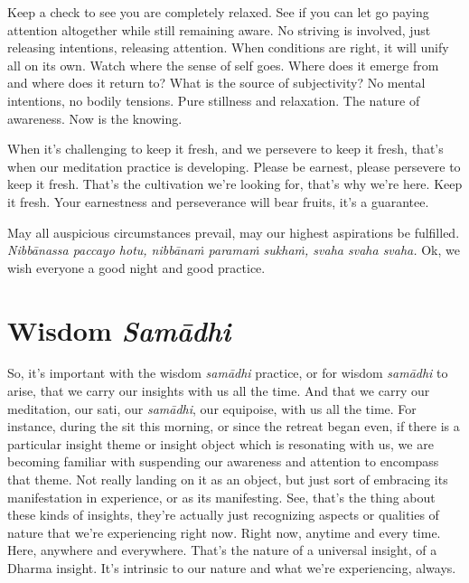 \documentclass[12pt,openany]{book}
\begin{document}
Keep a check to see you are completely relaxed. See if you can let go paying attention altogether while still remaining aware. No striving is involved, just releasing intentions, releasing attention. When conditions are right, it will unify all on its own. Watch where the sense of self goes. Where does it emerge from and where does it return to? What is the source of subjectivity? No mental intentions, no bodily tensions. Pure stillness and relaxation. The nature of awareness. Now is the knowing. 

When it's challenging to keep it fresh, and we persevere to keep it fresh, that's when our meditation practice is developing. Please be earnest, please persevere to keep it fresh. That's the cultivation we're looking for, that's why we're here. Keep it fresh. Your earnestness and perseverance will bear fruits, it's a guarantee. 

May all auspicious circumstances prevail, may our highest aspirations be fulfilled. \textit{Nibbānassa paccayo hotu, nibbānaṁ paramaṁ sukhaṁ, svaha svaha svaha.} Ok, we wish everyone a good night and good practice.

\chapter*{Wisdom \textit{Samādhi}}

So, it's important with the wisdom \textit{samādhi} practice, or for wisdom \textit{samādhi} to arise, that we carry our insights with us all the time. And that we carry our meditation, our sati, our \textit{samādhi}, our equipoise, with us all the time. For instance, during the sit this morning, or since the retreat began even, if there is a particular insight theme or insight object which is resonating with us, we are becoming familiar with suspending our awareness and attention to encompass that theme. Not really landing on it as an object, but just sort of embracing its manifestation in experience, or as its manifesting. See, that’s the thing about these kinds of insights, they're actually just recognizing aspects or qualities of nature that we're experiencing right now. Right now, anytime and every time. Here, anywhere and everywhere. That's the nature of a universal insight, of a Dhar\-ma insight. It's intrinsic to our nature and what we're experiencing, always.
\end{document}
